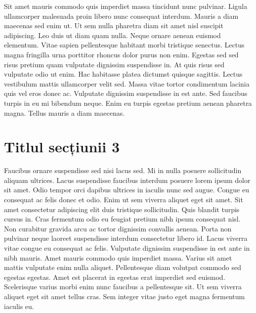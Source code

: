 Sit amet mauris commodo quis imperdiet massa tincidunt nunc pulvinar. Ligula ullamcorper malesuada proin libero nunc consequat interdum. Mauris a diam maecenas sed enim ut. Ut sem nulla pharetra diam sit amet nisl suscipit adipiscing. Leo duis ut diam quam nulla. Neque ornare aenean euismod elementum. Vitae sapien pellentesque habitant morbi tristique senectus. Lectus magna fringilla urna porttitor rhoncus dolor purus non enim. Egestas sed sed risus pretium quam vulputate dignissim suspendisse in. At quis risus sed vulputate odio ut enim. Hac habitasse platea dictumst quisque sagittis. Lectus vestibulum mattis ullamcorper velit sed. Massa vitae tortor condimentum lacinia quis vel eros donec ac. Vulputate dignissim suspendisse in est ante. Sed faucibus turpis in eu mi bibendum neque. Enim eu turpis egestas pretium aenean pharetra magna. Tellus mauris a diam maecenas.

\section{Titlul secțiunii 3}

Faucibus ornare suspendisse sed nisi lacus sed. Mi in nulla posuere sollicitudin aliquam ultrices. Lacus suspendisse faucibus interdum posuere lorem ipsum dolor sit amet. Odio tempor orci dapibus ultrices in iaculis nunc sed augue. Congue eu consequat ac felis donec et odio. Enim ut sem viverra aliquet eget sit amet. Sit amet consectetur adipiscing elit duis tristique sollicitudin. Quis blandit turpis cursus in. Cras fermentum odio eu feugiat pretium nibh ipsum consequat nisl. Non curabitur gravida arcu ac tortor dignissim convallis aenean. Porta non pulvinar neque laoreet suspendisse interdum consectetur libero id. Lacus viverra vitae congue eu consequat ac felis. Vulputate dignissim suspendisse in est ante in nibh mauris. Amet mauris commodo quis imperdiet massa. Varius sit amet mattis vulputate enim nulla aliquet. Pellentesque diam volutpat commodo sed egestas egestas. Amet est placerat in egestas erat imperdiet sed euismod. Scelerisque varius morbi enim nunc faucibus a pellentesque sit. Ut sem viverra aliquet eget sit amet tellus cras. Sem integer vitae justo eget magna fermentum iaculis eu.